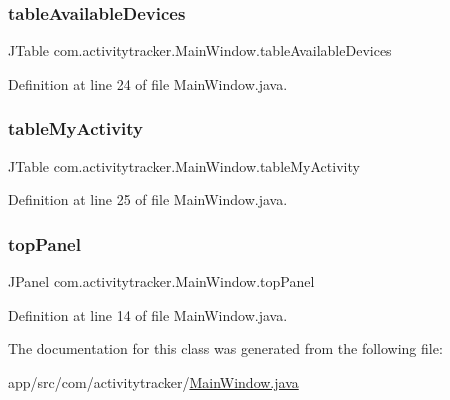 \subsubsection{\texorpdfstring{table\+Available\+Devices}{tableAvailableDevices}}
{\footnotesize\ttfamily J\+Table com.\+activitytracker.\+Main\+Window.\+table\+Available\+Devices\hspace{0.3cm}{\ttfamily [private]}}



Definition at line 24 of file Main\+Window.\+java.

\mbox{\label{classcom_1_1activitytracker_1_1_main_window_a0ad6d3ca1298275eba15a9ea189d4d9b}} 
\subsubsection{\texorpdfstring{table\+My\+Activity}{tableMyActivity}}
{\footnotesize\ttfamily J\+Table com.\+activitytracker.\+Main\+Window.\+table\+My\+Activity\hspace{0.3cm}{\ttfamily [private]}}



Definition at line 25 of file Main\+Window.\+java.

\mbox{\label{classcom_1_1activitytracker_1_1_main_window_a6baf76b2b8ede1ba82fc6d096ddb580b}} 
\subsubsection{\texorpdfstring{top\+Panel}{topPanel}}
{\footnotesize\ttfamily J\+Panel com.\+activitytracker.\+Main\+Window.\+top\+Panel\hspace{0.3cm}{\ttfamily [private]}}



Definition at line 14 of file Main\+Window.\+java.



The documentation for this class was generated from the following file\+:\begin{DoxyCompactItemize}
\item 
app/src/com/activitytracker/\mbox{\hyperlink{_main_window_8java}{Main\+Window.\+java}}\end{DoxyCompactItemize}
